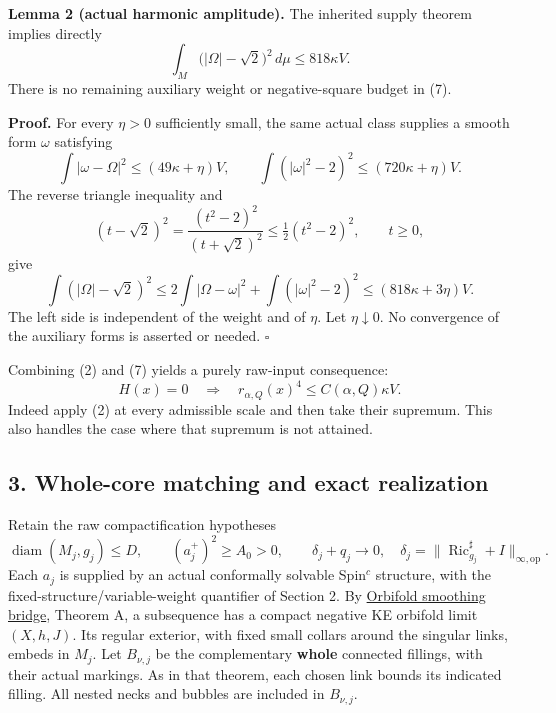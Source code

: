 \documentclass[
  11pt,
]{article}
\begin{document}
\textbf{Lemma 2 (actual harmonic amplitude).} The inherited supply
theorem implies directly \[
 \boxed{\displaystyle
  \int_M\bigl(|\Omega|-\sqrt2\bigr)^2\,d\mu
                          \le818\kappa V.}             \tag{7}
\] There is no remaining auxiliary weight or negative-square budget in
(7).

\textbf{Proof.} For every \(\eta>0\) sufficiently small, the same actual
class supplies a smooth form \(\omega\) satisfying \[
 \int|\omega-\Omega|^2\le(49\kappa+\eta)V,\qquad
 \int(|\omega|^2-2)^2\le(720\kappa+\eta)V.
\] The reverse triangle inequality and \[
       (t-\sqrt2)^2=\frac{(t^2-2)^2}{(t+\sqrt2)^2}
                      \le\tfrac12(t^2-2)^2,\qquad t\ge0,
\] give \[
 \int(|\Omega|-\sqrt2)^2
 \le2\int|\Omega-\omega|^2+\int(|\omega|^2-2)^2
 \le(818\kappa+3\eta)V.
\] The left side is independent of the weight and of \(\eta\). Let
\(\eta\downarrow0\). No convergence of the auxiliary forms is asserted
or needed. \(\square\)

Combining (2) and (7) yields a purely raw-input consequence: \[
 \boxed{H(x)=0\quad\Longrightarrow\quad
       r_{\alpha,Q}(x)^4\le C(\alpha,Q)\kappa V.}        \tag{8}
\] Indeed apply (2) at every admissible scale and then take their
supremum. This also handles the case where that supremum is not
attained.

\hypertarget{whole-core-matching-and-exact-realization}{%
\subsection{3. Whole-core matching and exact
realization}\label{whole-core-matching-and-exact-realization}}

Retain the raw compactification hypotheses \[
 \operatorname{diam}(M_j,g_j)\le D,\qquad
 (a_j^+)^2\ge A_0>0,\qquad
 \delta_j+q_j\longrightarrow0,
 \quad \delta_j=\|\operatorname{Ric}_{g_j}^{\sharp}+I\|_{\infty,\mathrm{op}}.
                                                               \tag{9}
\] Each \(a_j\) is supplied by an actual conformally solvable Spin\(^c\)
structure, with the fixed-structure/variable-weight quantifier of
Section 2. By \href{20260924_orbifold_smoothing_bridge.md}{Orbifold
smoothing bridge}, Theorem A, a subsequence has a compact negative KE
orbifold limit \((X,h,J)\). Its regular exterior, with fixed small
collars around the singular links, embeds in \(M_j\). Let \(B_{\nu,j}\)
be the complementary \textbf{whole} connected fillings, with their
actual markings. As in that theorem, each chosen link bounds its
indicated filling. All nested necks and bubbles are included in
\(B_{\nu,j}\).
\end{document}
